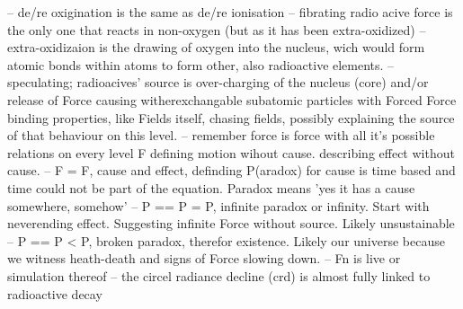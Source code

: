 -- de/re oxigination is the same as de/re ionisation
-- fibrating radio acive force is the only one that reacts in non-oxygen (but as it has been extra-oxidized)
-- extra-oxidizaion is the drawing of oxygen into the nucleus, wich would form atomic bonds within atoms to form other, also radioactive elements.
-- speculating; radioacives' source is over-charging of the nucleus (core) and/or release of Force causing witherexchangable subatomic particles with Forced Force binding properties,
like Fields itself, chasing fields, possibly explaining the source of that behaviour on this level.
-- remember force is force with all it's possible relations on every level F defining motion wihout cause. describing effect without cause.
-- F = F, cause and effect, definding P(aradox) for cause is time based and time could not be part of the equation. Paradox means 'yes it has a cause somewhere, somehow'
-- P == P = P, infinite paradox or infinity. Start with neverending effect. Suggesting infinite Force without source. Likely unsustainable
-- P == P < P, broken paradox, therefor existence. Likely our universe because we witness heath-death and signs of Force slowing down.
-- Fn is live or simulation thereof
-- the circel radiance decline (crd) is almost fully linked to radioactive decay 
